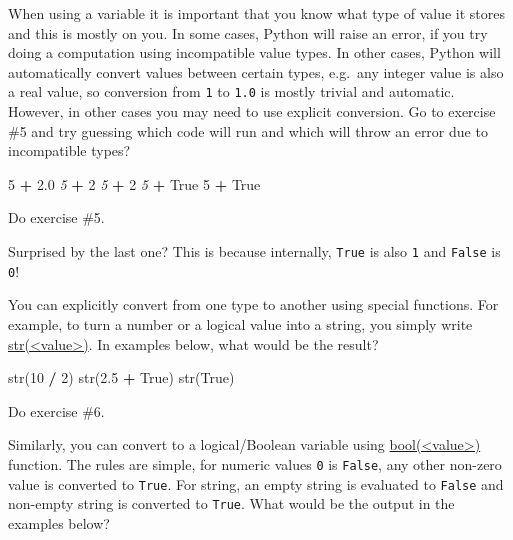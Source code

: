 \documentclass[
]{book}
\newenvironment{Shaded}{\begin{snugshade}}{\end{snugshade}}
\newcommand{\BuiltInTok}[1]{#1}
\newcommand{\CommentTok}[1]{\textcolor[rgb]{0.56,0.35,0.01}{\textit{#1}}}
\newcommand{\DecValTok}[1]{\textcolor[rgb]{0.00,0.00,0.81}{#1}}
\newcommand{\FloatTok}[1]{\textcolor[rgb]{0.00,0.00,0.81}{#1}}
\newcommand{\NormalTok}[1]{#1}
\newcommand{\OperatorTok}[1]{\textcolor[rgb]{0.81,0.36,0.00}{\textbf{#1}}}
\newcommand{\StringTok}[1]{\textcolor[rgb]{0.31,0.60,0.02}{#1}}
\newcommand{\VariableTok}[1]{\textcolor[rgb]{0.00,0.00,0.00}{#1}}
\begin{document}
When using a variable it is important that you know what type of value it stores and this is mostly on you. In some cases, Python will raise an error, if you try doing a computation using incompatible value types. In other cases, Python will automatically convert values between certain types, e.g.~any integer value is also a real value, so conversion from \texttt{1} to \texttt{1.0} is mostly trivial and automatic. However, in other cases you may need to use explicit conversion. Go to exercise \#5 and try guessing which code will run and which will throw an error due to incompatible types?

\begin{Shaded}
\begin{Highlighting}[]
\DecValTok{5} \OperatorTok{+} \FloatTok{2.0}
\CommentTok{\textquotesingle{}5\textquotesingle{}} \OperatorTok{+} \DecValTok{2}
\CommentTok{\textquotesingle{}5\textquotesingle{}} \OperatorTok{+} \StringTok{\textquotesingle{}2\textquotesingle{}}
\CommentTok{\textquotesingle{}5\textquotesingle{}} \OperatorTok{+} \VariableTok{True}
\DecValTok{5} \OperatorTok{+} \VariableTok{True}
\end{Highlighting}
\end{Shaded}

Do exercise \#5.

Surprised by the last one? This is because internally, \texttt{True} is also \texttt{1} and \texttt{False} is \texttt{0}!

You can explicitly convert from one type to another using special functions. For example, to turn a number or a logical value into a string, you simply write \href{https://docs.python.org/3/library/functions.html\#func-str}{str(\textless value\textgreater)}. In examples below, what would be the result?

\begin{Shaded}
\begin{Highlighting}[]
\BuiltInTok{str}\NormalTok{(}\DecValTok{10} \OperatorTok{/} \DecValTok{2}\NormalTok{)}
\BuiltInTok{str}\NormalTok{(}\FloatTok{2.5} \OperatorTok{+} \VariableTok{True}\NormalTok{)}
\BuiltInTok{str}\NormalTok{(}\VariableTok{True}\NormalTok{)}
\end{Highlighting}
\end{Shaded}

Do exercise \#6.

Similarly, you can convert to a logical/Boolean variable using \href{https://docs.python.org/3/library/functions.html\#bool}{bool(\textless value\textgreater)} function. The rules are simple, for numeric values \texttt{0} is \texttt{False}, any other non-zero value is converted to \texttt{True}. For string, an empty string \texttt{\textquotesingle{}\textquotesingle{}} is evaluated to \texttt{False} and non-empty string is converted to \texttt{True}. What would be the output in the examples below?
\end{document}
